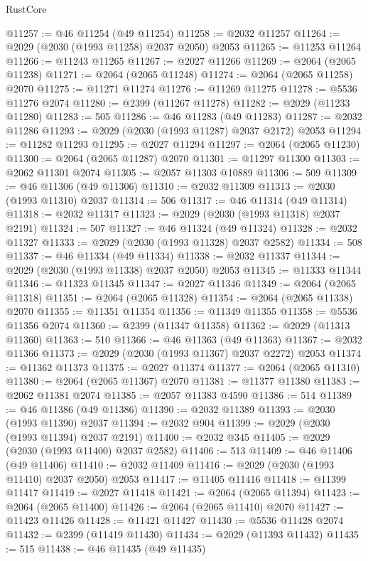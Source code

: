 \begin{lexlean}{RustCore}
\begin{coremodule}
@11257 := @46 @11254 (@49 @11254)
@11258 := @2032 @11257
@11264 := @2029 (@2030 (@1993 @11258) @2037 @2050) @2053
@11265 := @11253 @11264
@11266 := @11243 @11265
@11267 := @2027 @11266
@11269 := @2064 (@2065 @11238)
@11271 := @2064 (@2065 @11248)
@11274 := @2064 (@2065 @11258) @2070
@11275 := @11271 @11274
@11276 := @11269 @11275
@11278 := @5536 @11276 @2074
@11280 := @2399 (@11267 @11278)
@11282 := @2029 (@11233 @11280)
@11283 := 505
@11286 := @46 @11283 (@49 @11283)
@11287 := @2032 @11286
@11293 := @2029 (@2030 (@1993 @11287) @2037 @2172) @2053
@11294 := @11282 @11293
@11295 := @2027 @11294
@11297 := @2064 (@2065 @11230)
@11300 := @2064 (@2065 @11287) @2070
@11301 := @11297 @11300
@11303 := @2062 @11301 @2074
@11305 := @2057 @11303 @10889
@11306 := 509
@11309 := @46 @11306 (@49 @11306)
@11310 := @2032 @11309
@11313 := @2030 (@1993 @11310) @2037
@11314 := 506
@11317 := @46 @11314 (@49 @11314)
@11318 := @2032 @11317
@11323 := @2029 (@2030 (@1993 @11318) @2037 @2191)
@11324 := 507
@11327 := @46 @11324 (@49 @11324)
@11328 := @2032 @11327
@11333 := @2029 (@2030 (@1993 @11328) @2037 @2582)
@11334 := 508
@11337 := @46 @11334 (@49 @11334)
@11338 := @2032 @11337
@11344 := @2029 (@2030 (@1993 @11338) @2037 @2050) @2053
@11345 := @11333 @11344
@11346 := @11323 @11345
@11347 := @2027 @11346
@11349 := @2064 (@2065 @11318)
@11351 := @2064 (@2065 @11328)
@11354 := @2064 (@2065 @11338) @2070
@11355 := @11351 @11354
@11356 := @11349 @11355
@11358 := @5536 @11356 @2074
@11360 := @2399 (@11347 @11358)
@11362 := @2029 (@11313 @11360)
@11363 := 510
@11366 := @46 @11363 (@49 @11363)
@11367 := @2032 @11366
@11373 := @2029 (@2030 (@1993 @11367) @2037 @2272) @2053
@11374 := @11362 @11373
@11375 := @2027 @11374
@11377 := @2064 (@2065 @11310)
@11380 := @2064 (@2065 @11367) @2070
@11381 := @11377 @11380
@11383 := @2062 @11381 @2074
@11385 := @2057 @11383 @4590
@11386 := 514
@11389 := @46 @11386 (@49 @11386)
@11390 := @2032 @11389
@11393 := @2030 (@1993 @11390) @2037
@11394 := @2032 @904
@11399 := @2029 (@2030 (@1993 @11394) @2037 @2191)
@11400 := @2032 @345
@11405 := @2029 (@2030 (@1993 @11400) @2037 @2582)
@11406 := 513
@11409 := @46 @11406 (@49 @11406)
@11410 := @2032 @11409
@11416 := @2029 (@2030 (@1993 @11410) @2037 @2050) @2053
@11417 := @11405 @11416
@11418 := @11399 @11417
@11419 := @2027 @11418
@11421 := @2064 (@2065 @11394)
@11423 := @2064 (@2065 @11400)
@11426 := @2064 (@2065 @11410) @2070
@11427 := @11423 @11426
@11428 := @11421 @11427
@11430 := @5536 @11428 @2074
@11432 := @2399 (@11419 @11430)
@11434 := @2029 (@11393 @11432)
@11435 := 515
@11438 := @46 @11435 (@49 @11435)

\end{coremodule}
\end{lexlean}
